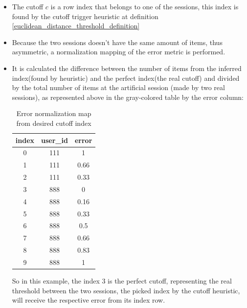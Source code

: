 \documentclass[ecp,tc,english]{iiufrgs}
\begin{document}
        
        \begin{itemize}
            \item The cutoff \(c\) is a row index that belongs to one of the sessions, this index is found by the cutoff trigger heuristic at definition \ref{euclidean_distance_threshold_definition}
            \item Because the two sessions doesn't have the same amount of items, thus asymmetric, a normalization mapping of the error metric is performed.
            \item It is calculated the difference between the number of items from the inferred index(found by heuristic) and the perfect index(the real cutoff) and divided by the total number of items at the artificial session (made by two real sessions), as represented above in the gray-colored table by the error column:
            
            \begin{table}[!ht]
                \centering
                \begin{tabular}{c|c|c}
                    \hline
                    \rowcolor[RGB]{239,239,239}
                    index & user\_id & error \\
                    \hline 
                    \rowcolor[RGB]{140,140,140}
                    0 & 111 & 1 \\ 
                    \rowcolor[RGB]{197,197,197}
                    1 & 111 & 0.66 \\ 
                    \rowcolor[RGB]{226,226,226}
                    2 & 111 & 0.33 \\ 
                    \rowcolor[RGB]{255,255,255}
                    3 & 888 & 0 \\ 
                    \rowcolor[RGB]{239,239,239}
                    4 & 888 & 0.16 \\ 
                    \rowcolor[RGB]{222,222,222}
                    5 & 888 & 0.33 \\ 
                    \rowcolor[RGB]{206,206,206}
                    6 & 888 & 0.5 \\ 
                    \rowcolor[RGB]{189,189,189}
                    7 & 888 & 0.66 \\ 
                    \rowcolor[RGB]{173,173,173}
                    8 & 888 & 0.83 \\ 
                    \rowcolor[RGB]{140,140,140}
                    9 & 888 & 1 \\ 
                    \hline
                \end{tabular}
                \caption{Error normalization map from desired cutoff index}
                \label{tab:cutoff_table}
            \end{table}
            
            So in this example, the index 3 is the perfect cutoff, representing the real threshold between the two sessions, the picked index by the cutoff heuristic, will receive the respective error from its index row.
        \end{itemize} 
\end{document}
